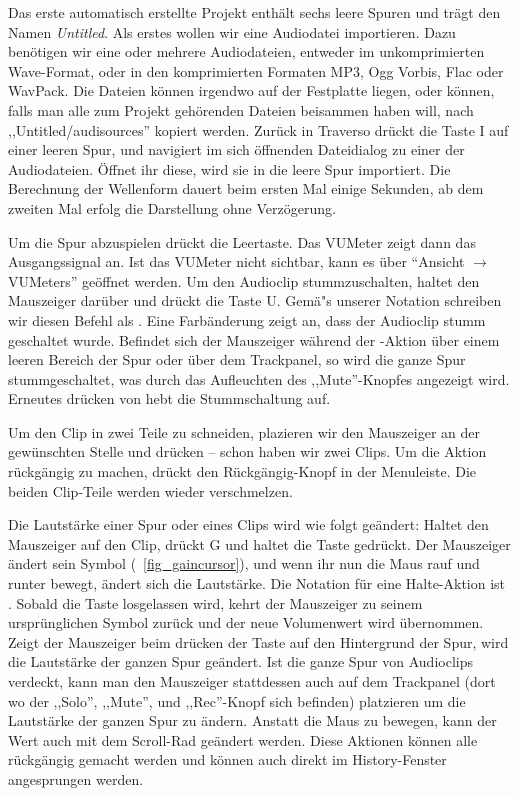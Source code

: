 Das erste automatisch erstellte Projekt enthält sechs leere Spuren und trägt den Namen \emph{Untitled}. Als erstes wollen wir eine Audiodatei importieren. Dazu benötigen wir eine oder mehrere Audiodateien, entweder im unkomprimierten Wave-Format, oder in den komprimierten Formaten MP3, Ogg Vorbis, Flac oder WavPack. Die Dateien können irgendwo auf der Festplatte liegen, oder können, falls man alle zum Projekt gehörenden Dateien beisammen haben will, nach ,,Untitled/audisources'' kopiert werden. Zurück in Traverso drückt die Taste I auf einer leeren Spur, und navigiert im sich öffnenden Dateidialog zu einer der Audiodateien. Öffnet ihr diese, wird sie in die leere Spur importiert. Die Berechnung der Wellenform dauert beim ersten Mal einige Sekunden, ab dem zweiten Mal erfolg die Darstellung ohne Verzögerung.

Um die Spur abzuspielen drückt die Leertaste. Das VUMeter zeigt dann das Ausgangssignal an. Ist das VUMeter nicht sichtbar, kann es über ``Ansicht $\rightarrow$ VUMeters'' geöffnet werden. Um den Audioclip stummzuschalten, haltet den Mauszeiger darüber und drückt die Taste U. Gemä"s unserer Notation schreiben wir diesen Befehl als . Eine Farbänderung zeigt an, dass der Audioclip stumm geschaltet wurde. Befindet sich der Mauszeiger während der -Aktion über einem leeren Bereich der Spur oder über dem Trackpanel, so wird die ganze Spur stummgeschaltet, was durch das Aufleuchten des ,,Mute''-Knopfes angezeigt wird. Erneutes drücken von  hebt die Stummschaltung auf.

Um den Clip in zwei Teile zu schneiden, plazieren wir den Mauszeiger an der gewünschten Stelle und drücken  -- schon haben wir zwei Clips. Um die Aktion rückgängig zu machen, drückt den Rückgängig-Knopf in der Menuleiste. Die beiden Clip-Teile werden wieder verschmelzen.

Die Lautstärke einer Spur oder eines Clips wird wie folgt geändert: Haltet den Mauszeiger auf den Clip, drückt G und haltet die Taste gedrückt. Der Mauszeiger ändert sein Symbol (\FigB\ \ref{fig_gaincursor}), und wenn ihr nun die Maus rauf und runter bewegt, ändert sich die Lautstärke. Die Notation für eine Halte-Aktion ist . Sobald die Taste losgelassen wird, kehrt der Mauszeiger zu seinem ursprünglichen Symbol zurück und der neue Volumenwert wird übernommen. Zeigt der Mauszeiger beim drücken der Taste auf den Hintergrund der Spur, wird die Lautstärke der ganzen Spur geändert. Ist die ganze Spur von Audioclips verdeckt, kann man den Mauszeiger stattdessen auch auf dem Trackpanel (dort wo der ,,Solo'', ,,Mute'', und ,,Rec''-Knopf sich befinden) platzieren um die Lautstärke der ganzen Spur zu ändern. Anstatt die Maus zu bewegen, kann der Wert auch mit dem Scroll-Rad geändert werden. Diese Aktionen können alle rückgängig gemacht werden und können auch direkt im History-Fenster angesprungen werden.

